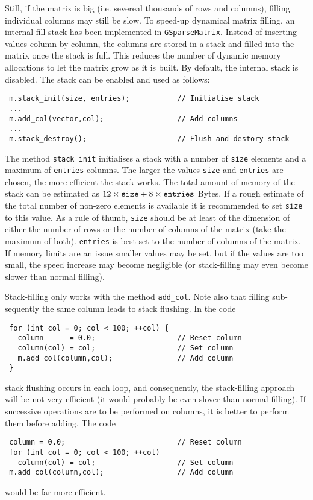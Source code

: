 \documentclass{article}[12pt,a4]
\begin{document}
Still, if the matrix is big (i.e. severeal thousands of rows and 
columns), filling individual columns may still be slow.
To speed-up dynamical matrix filling, an internal fill-stack has been 
implemented in {\tt GSparseMatrix}.
Instead of inserting values column-by-column, the columns are stored 
in a stack and filled into the matrix once the stack is full.
This reduces the number of dynamic memory allocations to let the 
matrix grow as it is built.
By default, the internal stack is disabled.
The stack can be enabled and used as follows:
\begin{verbatim}
 m.stack_init(size, entries);           // Initialise stack
 ...
 m.add_col(vector,col);                 // Add columns
 ...
 m.stack_destroy();                     // Flush and destory stack
\end{verbatim}
The method {\tt stack\_init} initialises a stack with a number of 
{\tt size} elements and a maximum of {\tt entries} columns.
The larger the values {\tt size} and {\tt entries} are chosen, the
more efficient the stack works.
The total amount of memory of the stack can be estimated as
$12 \times {\tt size} + 8 \times {\tt entries}$ Bytes.
If a rough estimate of the total number of non-zero elements is
available it is recommended to set {\tt size} to this value.
As a rule of thumb, {\tt size} should be at least of the dimension of 
either the number of rows or the number of columns of the matrix 
(take the maximum of both).
{\tt entries} is best set to the number of columns of the matrix.
If memory limits are an issue smaller values may be set, but if the
values are too small, the speed increase may become negligible (or 
stack-filling may even become slower than normal filling).

Stack-filling only works with the method {\tt add\_col}.
Note also that filling sub-sequently the same column leads to stack 
flushing.
In the code
\begin{verbatim}
 for (int col = 0; col < 100; ++col) {
   column      = 0.0;                   // Reset column
   column(col) = col;                   // Set column
   m.add_col(column,col);               // Add column
 }   
\end{verbatim}
stack flushing occurs in each loop, and consequently, the 
stack-filling approach will be not very efficient (it 
would probably be even slover than normal filling).
If successive operations are to be performed on columns, 
it is better to perform them before adding.
The code
\begin{verbatim}
 column = 0.0;                          // Reset column
 for (int col = 0; col < 100; ++col)
   column(col) = col;                   // Set column
 m.add_col(column,col);                 // Add column
\end{verbatim}
would be far more efficient.
\end{document}
